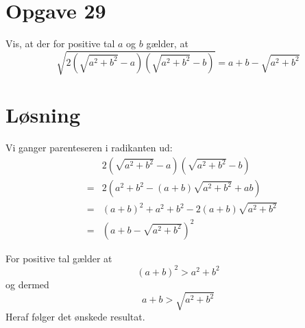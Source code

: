 \documentclass[12pt,oneside,a4paper]{article}
\newcommand{\bas}{\begin{eqnarray*}}
\newcommand{\eas}{\end{eqnarray*}}
\begin{document}
\section{Opgave 29}
Vis, at der for positive tal $a$ og $b$ gælder, at
$$
\sqrt{2\left(\sqrt{a^2+b^2}-a\right)\left(\sqrt{a^2+b^2}-b\right)} = a+b-\sqrt{a^2+b^2}
$$

\section{Løsning}
Vi ganger parenteseren i radikanten ud:
\bas
&& 2\left(\sqrt{a^2+b^2}-a\right)\left(\sqrt{a^2+b^2}-b\right) \\
&=& 2\left(a^2+b^2-(a+b)\sqrt{a^2+b^2} + ab\right) \\
&=& (a+b)^2 + a^2 + b^2 - 2(a+b)\sqrt{a^2+b^2} \\
&=& \left(a+b - \sqrt{a^2+b^2}\right)^2
\eas

For positive tal gælder at
$$
(a+b)^2 > a^2+b^2
$$
og dermed
$$
a+b > \sqrt{a^2+b^2}
$$
Heraf følger det ønskede resultat.
\end{document}
